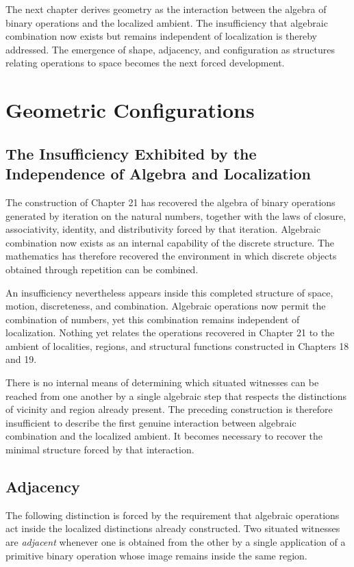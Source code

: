 \documentclass[12pt,anyside]{book}
\newcommand{\term}[1]{\textit{#1}}             %
\begin{document}
\begin{futurework}
The next chapter derives geometry as the interaction between the algebra of binary operations and the localized ambient. The insufficiency that algebraic combination now exists but remains independent of localization is thereby addressed. The emergence of shape, adjacency, and configuration as structures relating operations to space becomes the next forced development.
\end{futurework}

\chapter{Geometric Configurations}

\section{The Insufficiency Exhibited by the Independence of Algebra and Localization}
The construction of Chapter 21 has recovered the algebra of binary operations generated by iteration on the natural numbers, together with the laws of closure, associativity, identity, and distributivity forced by that iteration. Algebraic combination now exists as an internal capability of the discrete structure. The mathematics has therefore recovered the environment in which discrete objects obtained through repetition can be combined.

An insufficiency nevertheless appears inside this completed structure of space, motion, discreteness, and combination. Algebraic operations now permit the combination of numbers, yet this combination remains independent of localization. Nothing yet relates the operations recovered in Chapter 21 to the ambient of localities, regions, and structural functions constructed in Chapters 18 and 19. 

There is no internal means of determining which situated witnesses can be reached from one another by a single algebraic step that respects the distinctions of vicinity and region already present. The preceding construction is therefore insufficient to describe the first genuine interaction between algebraic combination and the localized ambient. It becomes necessary to recover the minimal structure forced by that interaction.

\section{Adjacency}
The following distinction is forced by the requirement that algebraic operations act inside the localized distinctions already constructed. Two situated witnesses are \term{adjacent} whenever one is obtained from the other by a single application of a primitive binary operation whose image remains inside the same region.
\end{document}
